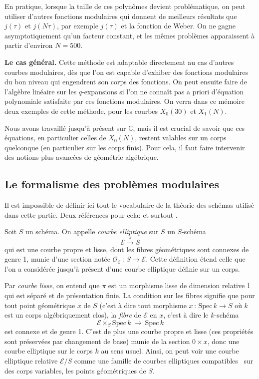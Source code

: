 \documentclass[11pt,a4paper]{article}
\newcommand{\C}{\mathbb{C}}
\newcommand{\E}{\mathcal{E}}
\renewcommand{\O}{\mathcal{O}}
\newcommand{\vers}{\longrightarrow}
\newcommand{\Spec}{\mathrm{Spec}\,}
\newcommand{\de}{\,:\,}
\renewcommand{\v}{\vspace{5mm}}
\theoremstyle{definition}
\begin{document}
En pratique, lorsque la taille de ces polynômes devient problématique, on peut utiliser d'autres fonctions modulaires qui donnent de meilleurs résultats que $j(\tau)$ et $j(N\tau)$, par exemple $j(\tau)$ et la fonction de Weber. On ne gagne asymptotiquement qu'un facteur constant, et les mêmes problèmes apparaissent à partir d'environ $N=500$.
\v

\textbf{Le cas général.} Cette méthode est adaptable directement au cas d'autres courbes modulaires, dès que l'on est capable d'exhiber des fonctions modulaires du bon niveau qui engendrent son corps des fonctions. On peut ensuite faire de l'algèbre linéaire sur les $q$-expansions si l'on ne connaît pas a priori d'équation polynomiale satisfaite par ces fonctions modulaires. On verra dans ce mémoire deux exemples de cette méthode, pour les courbes $X_0(30)$ et $X_1(N)$.

Nous avons travaillé jusqu'à présent sur $\C$, mais il est crucial de savoir que ces équations, en particulier celles de $X_0(N)$, restent valables sur un corps quelconque (en particulier sur les corps finis). Pour cela, il faut faire intervenir des notions plus avancées de géométrie algébrique.


\subsection{Le formalisme des problèmes modulaires}


Il est impossible de définir ici tout le vocabulaire de la théorie des schémas utilisé dans cette partie. Deux références pour cela: \cite{Hart} et surtout \cite{Stack}.


Soit $S$ un schéma. On appelle \emph{courbe elliptique} sur $S$ un $S$-schéma
$$\E \overset{\pi}{\vers} S$$
qui est une courbe propre et lisse, dont les fibres géométriques sont connexes de genre 1, munie d'une section notée $\O_\E\de S\vers \E$. Cette définition étend celle que l'on a considérée jusqu'à présent d'une courbe elliptique définie sur un corps.

Par \emph{courbe lisse}, on entend que $\pi$ est un morphisme lisse de dimension relative 1 qui est séparé et de présentation finie. La condition sur les fibres signifie que pour tout point géométrique $x$ de $S$ (c'est à dire tout morphisme $x\de\Spec k\vers S$ où $k$ est un corps algébriquement clos), la \emph{fibre} de $\E$ en $x$, c'est à dire le $k$-schéma
$$\E \times_S \Spec k\ \vers\ \Spec k$$
est connexe et de genre 1. C'est de plus une courbe propre et lisse (ces propriétés sont préservées par changement de base) munie de la section $0 \times x$, donc une courbe elliptique sur le corps $k$ au sens usuel. Ainsi, on peut voir une courbe elliptique relative $\E/S$ comme une famille de courbes elliptiques \og compatibles \fg\ sur des corps variables, les points géométriques de $S$.
\end{document}
